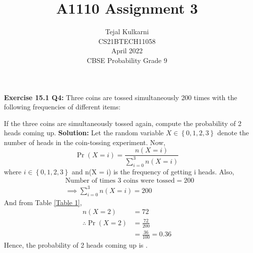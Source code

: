 \documentclass[journal,12pt,two column]{IEEEtran}
\title{A1110 Assignment 3 }
\author{Tejal Kulkarni \\ CS21BTECH11058 \\\vspace*{20pt} April 2022 \\ CBSE Probability Grade 9 }
\begin{document}
\newcommand{\solution}{\noindent \textbf{Solution: }}
\providecommand{\pr}[1]{\ensuremath{\Pr\left(#1\right)}}
\providecommand{\qfunc}[1]{\ensuremath{Q\left(#1\right)}}
\providecommand{\sbrak}[1]{\ensuremath{{}\left[#1\right]}}
\providecommand{\lsbrak}[1]{\ensuremath{{}\left[#1\right.}}
\providecommand{\rsbrak}[1]{\ensuremath{{}\left.#1\right]}}
\providecommand{\brak}[1]{\ensuremath{\left(#1\right)}}
\providecommand{\lbrak}[1]{\ensuremath{\left(#1\right.}}
\providecommand{\rbrak}[1]{\ensuremath{\left.#1\right)}}
\providecommand{\cbrak}[1]{\ensuremath{\left\{#1\right\}}}
\providecommand{\lcbrak}[1]{\ensuremath{\left\{#1\right.}}
\providecommand{\rcbrak}[1]{\ensuremath{\left.#1\right\}}}
\newcommand*{\permcomb}[4][0mu]{{{}^{#3}\mkern#1#2_{#4}}}
\newcommand*{\perm}[1][-3mu]{\permcomb[#1]{P}}
\newcommand*{\comb}[1][-1mu]{\permcomb[#1]{C}}
\renewcommand{\thetable}{\arabic{table}} 

\maketitle

\textbf{Exercise 15.1 Q4:} Three coins are tossed simultaneously 200 times with the following frequencies of different items:
\begin{table}[ht!]
    \centering
    
    \caption{}
    \label{Table 1}
\end{table}

If the three coins are simultaneously tossed again, compute the probability of 2 heads coming up. 
\solution
Let the random variable $X \in \cbrak{0,1,2,3}$ denote the number of heads in the coin-tossing experiment. Now, 
\begin{equation}
   \pr{X = i} = \dfrac{n(X = i)}{\sum_{i=0}^{3} n(X = i) }
\end{equation}
where $i \in \cbrak{0,1,2,3}$ and n(X = i) is the frequency of getting i heads. Also,
\begin{align}
&\text{Number of times 3 coins were tossed} = 200\\ 
&\implies  \sum_{i=0}^{3} n(X = i) = 200
\end{align}
And from Table \ref{Table 1}, 
\begin{align}
                n(X = 2) &= 72 \\
\therefore    \pr{X = 2} &= \frac{72}{200} \\
                         &= \frac{36}{100} = 0.36 
\end{align}
Hence, the probability of 2 heads coming up is .
\end{document}
